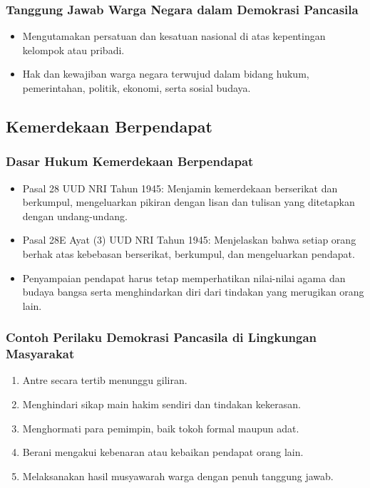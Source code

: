 \subsubsection{Tanggung Jawab Warga Negara dalam Demokrasi Pancasila}
\begin{itemize}
\item Mengutamakan persatuan dan kesatuan nasional di atas kepentingan kelompok atau pribadi.
\item Hak dan kewajiban warga negara terwujud dalam bidang hukum, pemerintahan, politik, ekonomi, serta sosial budaya.
\end{itemize}

\subsection{Kemerdekaan Berpendapat}

\subsubsection{Dasar Hukum Kemerdekaan Berpendapat}
\begin{itemize}
\item Pasal 28 UUD NRI Tahun 1945: Menjamin kemerdekaan berserikat dan berkumpul, mengeluarkan pikiran dengan lisan dan tulisan yang ditetapkan dengan undang-undang.
\item Pasal 28E Ayat (3) UUD NRI Tahun 1945: Menjelaskan bahwa setiap orang berhak atas kebebasan berserikat, berkumpul, dan mengeluarkan pendapat.
\item Penyampaian pendapat harus tetap memperhatikan nilai-nilai agama dan budaya bangsa serta menghindarkan diri dari tindakan yang merugikan orang lain.
\end{itemize}

\subsubsection{Contoh Perilaku Demokrasi Pancasila di Lingkungan Masyarakat}
\begin{enumerate}
\item Antre secara tertib menunggu giliran.
\item Menghindari sikap main hakim sendiri dan tindakan kekerasan.
\item Menghormati para pemimpin, baik tokoh formal maupun adat.
\item Berani mengakui kebenaran atau kebaikan pendapat orang lain.
\item Melaksanakan hasil musyawarah warga dengan penuh tanggung jawab.
\end{enumerate}

